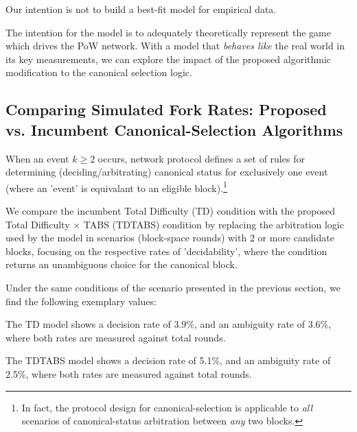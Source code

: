 \documentclass[11pt]{article}
\theoremstyle{plain}
\begin{document}
Our intention is not to build a best-fit model for empirical data.

The intention for the model is to adequately theoretically represent the game
which drives the PoW network. With a model that \emph{behaves like} the real
world in its key measurements, we can explore the impact of the proposed
algorithmic modification to the canonical selection logic.

\subsection{\normalsize{
    Comparing Simulated Fork Rates:
    Proposed vs. Incumbent Canonical-Selection Algorithms
}}

When an event $k \geq 2$ occurs, network protocol defines a set of rules for
determining (deciding/arbitrating) canonical status for exclusively one event
(where an 'event' is equivalant to an eligible block).\footnote{
  In fact, the protocol design for canonical-selection is applicable to \emph{all}
  scenarios of canonical-status arbitration between \emph{any} two blocks.
}

We compare the incumbent Total Difficulty (TD) condition with the proposed
Total Difficulty $\times$ TABS (TDTABS) condition by replacing the arbitration
logic used by the model in scenarios (block-space rounds) with $2$ or more
candidate blocks, focusing on the respective rates of 'decidability', where
the condition returns an unambiguous choice for the canonical block.

Under the same conditions of the scenario presented in the previous section,
we find the following exemplary values:




The TD model shows a decision rate of 3.9\%, and an ambiguity rate of 3.6\%,
where both rates are measured against total rounds.

The TDTABS model shows a decision rate of 5.1\%, and an ambiguity rate of 2.5\%,
where both rates are measured against total rounds.


\end{document}

